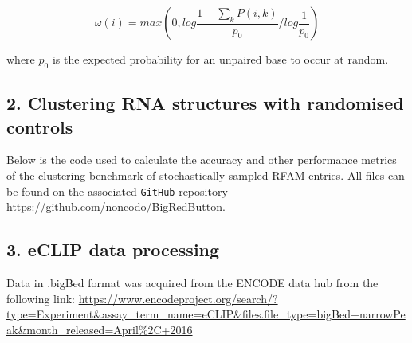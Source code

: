 \documentclass[a4paper,11pt]{article}
\begin{document}
\begin{equation}\label{eq12}
	\omega(i) = max \left( 0, log \frac{1 - \sum_k P(i,k)}{p_0} / log \frac{1}{p_0} \right)
\end{equation}

\noindent  where $p_0$ is the expected probability for an unpaired base to occur at
random.

\subsection*{ 2. Clustering RNA structures with randomised controls }

Below is the code used to calculate the accuracy and other performance metrics of 
the clustering benchmark of stochastically sampled RFAM entries. All files can be found on the 
associated \texttt{GitHub} repository \url{https://github.com/noncodo/BigRedButton}.



\subsection*{ 3. eCLIP data processing }
Data in .bigBed format was acquired from the ENCODE data hub from the following link:
\url{https://www.encodeproject.org/search/?type=Experiment&assay_term_name=eCLIP&files.file_type=bigBed+narrowPeak&month_released=April\%2C+2016}
\end{document}
